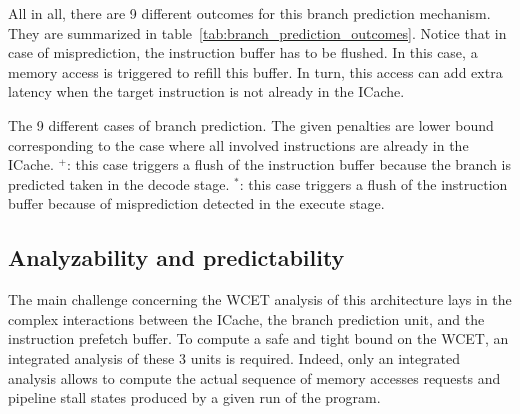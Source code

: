 All in all, there are 9 different outcomes for this branch prediction mechanism. 
They are summarized in table~\ref{tab:branch_prediction_outcomes}.
Notice that in case of misprediction, the instruction buffer has to be flushed.
In this case, a memory access is triggered to refill this buffer.
In turn, this access can add extra latency when the target instruction is not already in the ICache.

\begin{table}
    \centering
    \caption{The 9 different cases of branch prediction. The given penalties are lower bound corresponding to the case where all involved instructions are already in the ICache. $^+$: this case triggers a flush of the instruction buffer because the branch is predicted taken in the decode stage. $^*$: this case triggers a flush of the instruction buffer because of misprediction detected in the execute stage. }
    \label{tab:branch_prediction_outcomes}
    \vspace{1em}
    
\end{table}



\subsection{Analyzability and predictability}

The main challenge concerning the WCET analysis of this architecture lays in the complex interactions between the ICache, the branch prediction unit, and the instruction prefetch buffer.
To compute a safe and tight bound on the WCET, an integrated analysis of these 3 units is required.
Indeed, only an integrated analysis allows to compute the actual sequence of memory accesses requests and pipeline stall states produced by a given run of the program.


